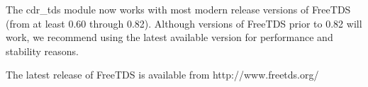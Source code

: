 The cdr\_tds module now works with most modern release versions of FreeTDS (from
at least 0.60 through 0.82).  Although versions of FreeTDS prior to 0.82 will
work, we recommend using the latest available version for performance and
stability reasons.

The latest release of FreeTDS is available from http://www.freetds.org/
